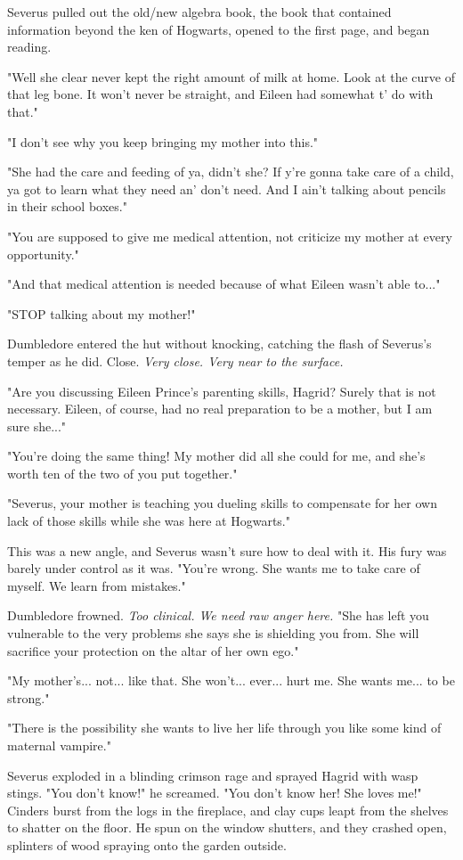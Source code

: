 Severus pulled out the old\slash new algebra book, the book that contained information beyond the ken of Hogwarts, opened to the first page, and began reading.

"Well she clear never kept the right amount of milk at home. Look at the curve of that leg bone. It won't never be straight, and Eileen had somewhat t' do with that."

"I don't see why you keep bringing my mother into this."

"She had the care and feeding of ya, didn't she? If y're gonna take care of a child, ya got to learn what they need an' don't need. And I ain't talking about pencils in their school boxes."

"You are supposed to give me medical attention, not criticize my mother at every opportunity."

"And that medical attention is needed because of what Eileen wasn't able to..."

"STOP talking about my mother!"

Dumbledore entered the hut without knocking, catching the flash of Severus's temper as he did. Close. \emph{Very close. Very near to the surface.}

"Are you discussing Eileen Prince's parenting skills, Hagrid? Surely that is not necessary. Eileen, of course, had no real preparation to be a mother, but I am sure she..."

"You're doing the same thing! My mother did all she could for me, and she's worth ten of the two of you put together."

"Severus, your mother is teaching you dueling skills to compensate for her own lack of those skills while she was here at Hogwarts."

This was a new angle, and Severus wasn't sure how to deal with it. His fury was barely under control as it was. "You're wrong. She wants me to take care of myself. We learn from mistakes."

Dumbledore frowned. \emph{Too clinical. We need raw anger here.} "She has left you vulnerable to the very problems she says she is shielding you from. She will sacrifice your protection on the altar of her own ego."

"My mother's... not... like that. She won't... ever... hurt me. She wants me... to be strong."

"There is the possibility she wants to live her life through you like some kind of maternal vampire."

Severus exploded in a blinding crimson rage and sprayed Hagrid with wasp stings. "You don't know!" he screamed. "You don't know her! She loves me!" Cinders burst from the logs in the fireplace, and clay cups leapt from the shelves to shatter on the floor. He spun on the window shutters, and they crashed open, splinters of wood spraying onto the garden outside.


